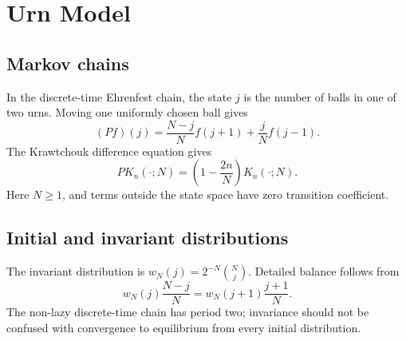 \chapter{Urn Model}
\label{ch:3}
\section{Markov chains}
\label{sec:3-1}
In the discrete-time Ehrenfest chain, the state $j$ is the number of balls in one of two urns. Moving one uniformly chosen ball gives
\[
(Pf)(j)=\frac{N-j}{N}f(j+1)+\frac jN f(j-1).
\]
The Krawtchouk difference equation gives
\[
P K_n(\cdot;N)=\left(1-\frac{2n}{N}\right)K_n(\cdot;N).
\]
Here $N\geq1$, and terms outside the state space have zero transition coefficient.

\section{Initial and invariant distributions}
\label{sec:3-2}
The invariant distribution is $w_N(j)=2^{-N}\binom Nj$. Detailed balance follows from
\[
w_N(j)\frac{N-j}{N}=w_N(j+1)\frac{j+1}{N}.
\]
The non-lazy discrete-time chain has period two; invariance should not be confused with convergence to equilibrium from every initial distribution.

